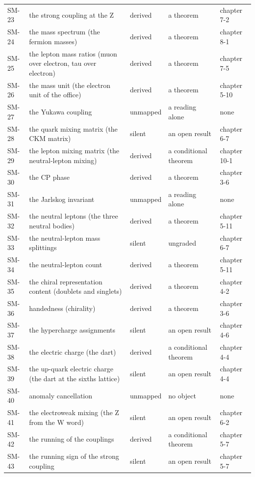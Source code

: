 {\begin{longtable}{@{}lp{58mm}llp{30mm}@{}}
SM-23 & the strong coupling at the Z & derived & a theorem & chapter 7-2 \\
SM-24 & the mass spectrum (the fermion masses) & derived & a theorem & chapter 8-1 \\
SM-25 & the lepton mass ratios (muon over electron, tau over electron) & derived & a theorem & chapter 7-5 \\
SM-26 & the mass unit (the electron unit of the office) & derived & a theorem & chapter 5-10 \\
SM-27 & the Yukawa coupling & unmapped & a reading alone & none \\
SM-28 & the quark mixing matrix (the CKM matrix) & silent & an open result & chapter 6-7 \\
SM-29 & the lepton mixing matrix (the neutral-lepton mixing) & derived & a conditional theorem & chapter 10-1 \\
SM-30 & the CP phase & derived & a theorem & chapter 3-6 \\
SM-31 & the Jarlskog invariant & unmapped & a reading alone & none \\
SM-32 & the neutral leptons (the three neutral bodies) & derived & a theorem & chapter 5-11 \\
SM-33 & the neutral-lepton mass splittings & silent & ungraded & chapter 6-7 \\
SM-34 & the neutral-lepton count & derived & a theorem & chapter 5-11 \\
SM-35 & the chiral representation content (doublets and singlets) & derived & a theorem & chapter 4-2 \\
SM-36 & handedness (chirality) & derived & a theorem & chapter 3-6 \\
SM-37 & the hypercharge assignments & silent & an open result & chapter 4-6 \\
SM-38 & the electric charge (the dart) & derived & a conditional theorem & chapter 4-4 \\
SM-39 & the up-quark electric charge (the dart at the sixths lattice) & silent & an open result & chapter 4-4 \\
SM-40 & anomaly cancellation & unmapped & no object & none \\
SM-41 & the electroweak mixing (the Z from the W word) & silent & an open result & chapter 6-2 \\
SM-42 & the running of the couplings & derived & a conditional theorem & chapter 5-7 \\
SM-43 & the running sign of the strong coupling & silent & an open result & chapter 5-7 \\

\end{longtable}}
